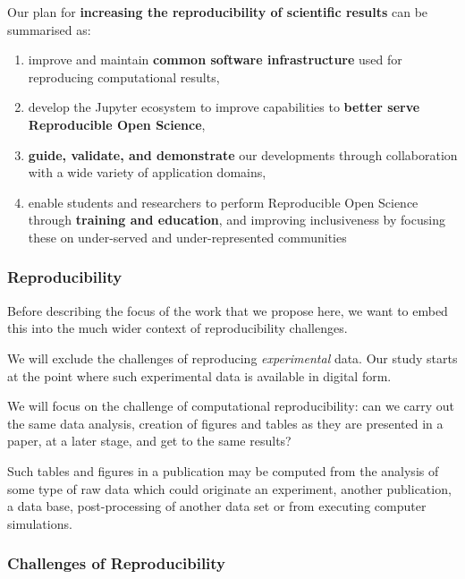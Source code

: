 \noindent Our plan for \textbf{increasing the reproducibility of scientific results} can be summarised as:

\begin{enumerate}
\item improve and maintain \textbf{common software infrastructure} used for
  reproducing computational results,
\item develop the Jupyter ecosystem to improve capabilities to \textbf{better
  serve Reproducible Open Science},
\item \textbf{guide, validate, and demonstrate} our developments through
  collaboration with a wide variety of application domains,
\item enable students and researchers to perform Reproducible Open Science through
  \textbf{training and education}, and improving inclusiveness by focusing
  these on under-served and under-represented communities
\end{enumerate}

\medskip

\subsubsection{Reproducibility}\label{sec:concept}

Before describing the focus of the work that we propose here, we want to embed
this into the much wider context of reproducibility challenges.

We will exclude the challenges of reproducing \emph{experimental} data. Our
study starts at the point where such experimental data is available in digital
form.

We will focus on the challenge of computational reproducibility: can we carry out
the same data analysis, creation of figures and tables as they are presented in
a paper, at a later stage, and get to the same results?

Such tables and figures in a publication may be computed from the analysis of
some type of raw data which could originate an experiment, another publication,
a data base, post-processing of another data set or from executing computer
simulations.


\subsubsection{Challenges of Reproducibility}

